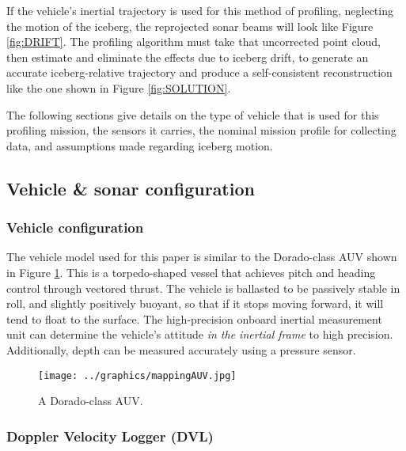 If the vehicle's inertial trajectory is used for this method of profiling, neglecting the motion of the iceberg, the reprojected sonar beams will look like Figure \ref{fig:DRIFT}. The profiling algorithm must take that uncorrected point cloud, then estimate and eliminate the effects due to iceberg drift, to generate an accurate iceberg-relative trajectory and produce a self-consistent reconstruction like the one shown in Figure \ref{fig:SOLUTION}.

The following sections give details on the type of vehicle that is used for this profiling mission, the sensors it carries, the nominal mission profile for collecting data, and assumptions made regarding iceberg motion. 

\subsection{Vehicle \& sonar configuration}
\label{sec.VehicleSetup}

\subsubsection{Vehicle configuration}
The vehicle model used for this paper is similar to the Dorado-class AUV shown in Figure \ref{fig:AUVdorado}. This is a torpedo-shaped vessel that achieves pitch and heading control through vectored thrust. The vehicle is ballasted to be passively stable in roll, and slightly positively buoyant, so that if it stops moving forward, it will tend to float to the surface. The high-precision onboard inertial measurement unit can determine the vehicle's attitude \emph{in the inertial frame} to high precision. Additionally, depth can be measured accurately using a pressure sensor. 

\begin{figure}[htb]
   \centering
   \texttt{[image: ../graphics/mappingAUV.jpg]} %
   \caption{A Dorado-class AUV.}
   \label{fig:AUVdorado}
\end{figure}



\subsubsection{Doppler Velocity Logger (DVL)}

